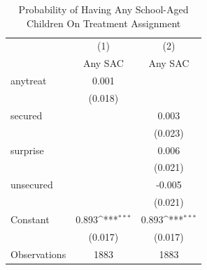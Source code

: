 \begin{table}[htbp]\centering
\def\sym#1{\ifmmode^{#1}\else\(^{#1}\)\fi}
\caption{Probability of Having Any School-Aged Children On Treatment Assignment\label{sacreg}}
\begin{tabular}{l*{2}{c}}
\toprule
                    &\multicolumn{1}{c}{(1)}&\multicolumn{1}{c}{(2)}\\
                    &\multicolumn{1}{c}{Any SAC}&\multicolumn{1}{c}{Any SAC}\\
\midrule
anytreat            &       0.001         &                     \\
                    &     (0.018)         &                     \\
secured             &                     &       0.003         \\
                    &                     &     (0.023)         \\
surprise            &                     &       0.006         \\
                    &                     &     (0.021)         \\
unsecured           &                     &      -0.005         \\
                    &                     &     (0.021)         \\
Constant            &       0.893\sym{***}&       0.893\sym{***}\\
                    &     (0.017)         &     (0.017)         \\
\midrule
Observations        &        1883         &        1883         \\
\bottomrule
\end{tabular}
\end{table}
